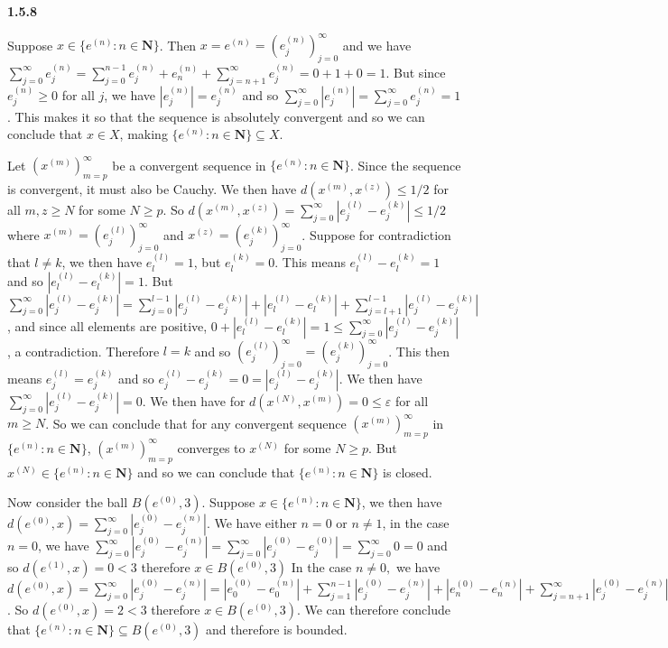 \documentclass[12pt]{article}
\begin{document}
\textbf{1.5.8}

Suppose $x\in \{e^{(n)}:n\in \textbf{N}\}$. Then $x = e^{(n)} = (e^{(n)}_j)_{j=0}^\infty$ and we have $\sum_{j=0}^\infty e^{(n)}_j= \sum_{j=0}^{n-1}e^{(n)}_j+e^{(n)}_n +\sum_{j=n+1}^\infty e^{(n)}_j= 0+1+0=1$. But since $e^{(n)}_j\geq 0$ for all $j$, we have $|e^{(n)}_j|=e^{(n)}_j$ and so 
$\sum_{j=0}^\infty |e^{(n)}_j| =\sum_{j=0}^\infty e^{(n)}_j = 1$. This makes it so that the sequence is absolutely convergent and so we can conclude that $x\in X$, making $\{e^{(n)}:n\in \textbf{N}\}\subseteq X$. 

Let $(x^{(m)})^\infty_{m=p}$ be a convergent sequence in $\{e^{(n)}:n\in \textbf{N}\}$. Since the sequence is convergent, it must also be Cauchy. We then have $d(x^{(m)},x^{(z)})\leq 1/2$ for all $m,z\geq N$ for some $N\geq p$. So $d(x^{(m)},x^{(z)})=\sum_{j=0}^\infty|e^{(l)}_j-e^{(k)}_j|\leq 1/2$ where $x^{(m)} = (e^{(l)}_j)_{j=0}^\infty$ and $x^{(z)}=(e^{(k)}_j)_{j=0}^\infty$. Suppose for contradiction that $l\neq k$, we then have $e^{(l)}_l = 1$, but $e^{(k)}_l = 0$. This means $e^{(l)}_l-e^{(k)}_l = 1$ and so $|e^{(l)}_l-e^{(k)}_l| = 1$. But $\sum_{j=0}^\infty|e^{(l)}_j-e^{(k)}_j| = \sum_{j=0}^{l-1}|e^{(l)}_j-e^{(k)}_j| + |e^{(l)}_l-e^{(k)}_l| + \sum_{j=l+1}^{l-1}|e^{(l)}_j-e^{(k)}_j|$, and since all elements are positive, $0+|e^{(l)}_l-e^{(k)}_l| = 1\leq \sum_{j=0}^\infty|e^{(l)}_j-e^{(k)}_j|$, a contradiction. Therefore $l=k$ and so $(e^{(l)}_j)_{j=0}^\infty=(e^{(k)}_j)_{j=0}^\infty$. This then means $e^{(l)}_j =e^{(k)}_j$ and so $e^{(l)}_j-e^{(k)}_j= 0 = |e^{(l)}_j-e^{(k)}_j|$. We then have $\sum_{j=0}^\infty|e^{(l)}_j-e^{(k)}_j| = 0$. We then have for $d(x^{(N)}, x^{(m)}) = 0\leq \varepsilon $ for all $m\geq N$. So we can conclude that for any convergent sequence $(x^{(m)})^\infty_{m=p}$ in $\{e^{(n)}:n\in \textbf{N}\}$, $(x^{(m)})^\infty_{m=p}$ converges to $x^{(N)}$ for some $N\geq p$. But $x^{(N)}\in \{e^{(n)}:n\in \textbf{N}\}$ and so we can conclude that $\{e^{(n)}:n\in \textbf{N}\}$ is closed.

Now consider the ball $B(e^{(0)},3)$. Suppose $x\in \{e^{(n)}:n\in \textbf{N}\}$, we then have $d(e^{(0)},x) = \sum^{\infty}_{j=0}|e^{(0)}_j-e^{(n)}_j|$. We have either $n= 0$ or $n\neq 1$, in the case $n=0$, we have $\sum^{\infty}_{j=0}|e^{(0)}_j-e^{(n)}_j| = \sum^{\infty}_{j=0}|e^{(0)}_j-e^{(0)}_j| =  \sum^{\infty}_{j=0} 0 = 0$ and so $d(e^{(1)},x)=0 <3$ therefore $x\in B(e^{(0)},3)$ In the case $n\neq 0,$ we have $d(e^{(0)},x) = \sum^{\infty}_{j=0}|e^{(0)}_j-e^{(n)}_j| =|e^{(0)}_0-e^{(n)}_0|+\sum^{n-1}_{j=1}|e^{(0)}_j-e^{(n)}_j|+|e^{(0)}_n-e^{(n)}_n|+\sum^{\infty}_{j=n+1}|e^{(0)}_j-e^{(n)}_j| = 1+0+1+0 = 2$. So $d(e^{(0)},x)=2 <3$ therefore $x\in B(e^{(0)},3)$. We can therefore conclude that $\{e^{(n)}:n\in \textbf{N}\}\subseteq B(e^{(0)},3)$ and therefore is bounded.
\end{document}
